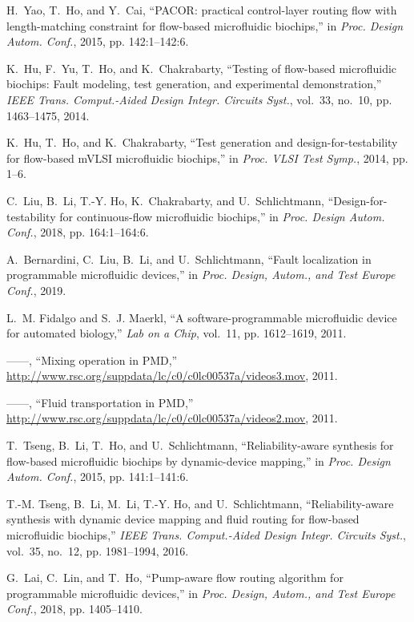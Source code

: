 \documentclass[journal,twoside]{IEEEtran}
\begin{document}
\begin{thebibliography}{10}
H.~Yao, T.~Ho, and Y.~Cai, ``{PACOR:} practical control-layer routing flow with
  length-matching constraint for flow-based microfluidic biochips,'' in
  \emph{Proc. Design Autom. Conf.}, 2015, pp. 142:1--142:6.

K.~Hu, F.~Yu, T.~Ho, and K.~Chakrabarty, ``Testing of flow-based microfluidic
  biochips: Fault modeling, test generation, and experimental demonstration,''
  \emph{{IEEE} Trans. Comput.-Aided Design Integr. Circuits Syst.}, vol.~33,
  no.~10, pp. 1463--1475, 2014.

K.~Hu, T.~Ho, and K.~Chakrabarty, ``Test generation and design-for-testability
  for flow-based m{VLSI} microfluidic biochips,'' in \emph{Proc. {VLSI} Test
  Symp.}, 2014, pp. 1--6.

C.~Liu, B.~Li, T.-Y. Ho, K.~Chakrabarty, and U.~Schlichtmann,
  ``Design-for-testability for continuous-flow microfluidic biochips,'' in
  \emph{Proc. Design Autom. Conf.}, 2018, pp. 164:1--164:6.

A.~Bernardini, C.~Liu, B.~Li, and U.~Schlichtmann, ``Fault localization in
  programmable microfluidic devices,'' in \emph{Proc. Design, Autom., and Test
  Europe Conf.}, 2019.

L.~M. Fidalgo and S.~J. Maerkl, ``A software-programmable microfluidic device
  for automated biology,'' \emph{Lab on a Chip}, vol.~11, pp. 1612--1619, 2011.

------, ``Mixing operation in {PMD},''
  \url{http://www.rsc.org/suppdata/lc/c0/c0lc00537a/videos3.mov}, 2011.

------, ``Fluid transportation in {PMD},''
  \url{http://www.rsc.org/suppdata/lc/c0/c0lc00537a/videos2.mov}, 2011.

T.~Tseng, B.~Li, T.~Ho, and U.~Schlichtmann, ``Reliability-aware synthesis for
  flow-based microfluidic biochips by dynamic-device mapping,'' in \emph{Proc.
  Design Autom. Conf.}, 2015, pp. 141:1--141:6.

T.-M. Tseng, B.~Li, M.~Li, T.-Y. Ho, and U.~Schlichtmann, ``Reliability-aware
  synthesis with dynamic device mapping and fluid routing for flow-based
  microfluidic biochips,'' \emph{{IEEE} Trans. Comput.-Aided Design Integr.
  Circuits Syst.}, vol.~35, no.~12, pp. 1981--1994, 2016.

G.~Lai, C.~Lin, and T.~Ho, ``Pump-aware flow routing algorithm for programmable
  microfluidic devices,'' in \emph{Proc. Design, Autom., and Test Europe
  Conf.}, 2018, pp. 1405--1410.


\end{thebibliography}
\end{document}
